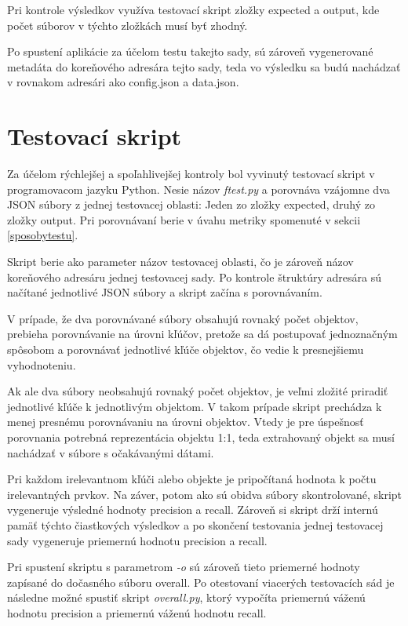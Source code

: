 \bigskip

Pri kontrole výsledkov využíva testovací skript zložky expected a output, kde počet súborov v týchto zložkách musí byť zhodný.

Po spustení aplikácie za účelom testu takejto sady, sú zároveň vygenerované metadáta do koreňového adresára tejto sady, teda vo výsledku sa budú nachádzať v rovnakom adresári ako config.json a data.json.


\section{Testovací skript}

Za účelom rýchlejšej a spoľahlivejšej kontroly bol vyvinutý testovací skript v programovacom jazyku Python. Nesie názov \textit{ftest.py} a porovnáva vzájomne dva JSON súbory z jednej testovacej oblasti: Jeden zo zložky expected, druhý zo zložky output. Pri porovnávaní berie v úvahu metriky spomenuté v sekcii \ref{sposobytestu}.

Skript berie ako parameter názov testovacej oblasti, čo je zároveň názov koreňového adresáru jednej testovacej sady. Po kontrole štruktúry adresára sú načítané jednotlivé JSON súbory a skript začína s porovnávaním.

V prípade, že dva porovnávané súbory obsahujú rovnaký počet objektov, prebieha porovnávanie na úrovni kľúčov, pretože sa dá postupovať jednoznačným spôsobom a porovnávať jednotlivé kľúče objektov, čo vedie k presnejšiemu vyhodnoteniu. 

Ak ale dva súbory neobsahujú rovnaký počet objektov, je veľmi zložité priradiť jednotlivé kľúče k jednotlivým objektom. V takom prípade skript prechádza k menej presnému porovnávaniu na úrovni objektov. Vtedy je pre úspešnosť porovnania potrebná reprezentácia objektu 1:1, teda extrahovaný objekt sa musí nachádzať v súbore s očakávanými dátami.

Pri každom irelevantnom kľúči alebo objekte je pripočítaná hodnota k počtu irelevantných prvkov. Na záver, potom ako sú obidva súbory skontrolované, skript vygeneruje výsledné hodnoty precision a recall. Zároveň si skript drží internú pamäť týchto čiastkových výsledkov a po skončení testovania jednej testovacej sady vygeneruje priemernú hodnotu precision a recall.

Pri spustení skriptu s parametrom \textit{-o} sú zároveň tieto priemerné hodnoty zapísané do dočasného súboru overall. Po otestovaní viacerých testovacích sád je následne možné spustiť skript \textit{overall.py}, ktorý vypočíta priemernú váženú hodnotu precision a priemernú váženú hodnotu recall.


